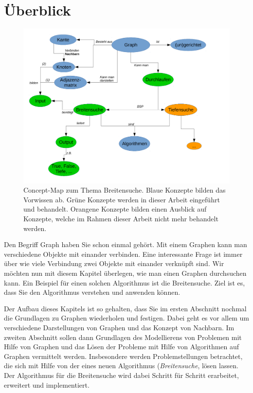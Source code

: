 \section*{Überblick}

\begin{figure}[htb]
\begin{center}
\includegraphics[width=.99\textwidth]{../cmap/bsuche_cmap.pdf}
\caption{Concept-Map zum Thema Breitensuche.
Blaue Konzepte bilden das Vorwissen ab. 
Grüne Konzepte werden in dieser Arbeit eingeführt und behandelt. 
Orangene Konzepte bilden einen Ausblick auf Konzepte, welche im Rahmen dieser Arbeit nicht mehr behandelt werden. 
}
\label{fig:cmap2}
\end{center}
\end{figure}


Den Begriff Graph haben Sie schon einmal gehört. Mit einem Graphen kann man verschiedene Objekte mit einander verbinden. 
Eine interessante Frage ist immer über wie viele Verbindung zwei Objekte mit einander verknüpft sind. 
Wir möchten nun mit diesem Kapitel überlegen, wie man einen Graphen durchsuchen kann.
Ein Beispiel für einen solchen Algorithmus ist die Breitensuche. 
Ziel ist es, dass Sie den Algorithmus verstehen und anwenden können. 

Der Aufbau dieses Kapitels ist so gehalten, dass Sie im ersten Abschnitt nochmal die Grundlagen zu Graphen wiederholen und festigen. 
Dabei geht es vor allem um verschiedene Darstellungen von Graphen und das Konzept von Nachbarn.
Im zweiten Abschnitt sollen dann Grundlagen des Modellierens von Problemen mit Hilfe von Graphen und das L\"osen der Probleme mit Hilfe von Algorithmen auf Graphen vermittelt werden.
Insbesondere werden Problemstellungen betrachtet, die sich mit Hilfe von der eines neuen Algorithmus (\emph{Breitensuche}, lösen lassen. 
Der Algorithmus für die Breitensuche wird dabei Schritt f\"ur Schritt erarbeitet, erweitert und implementiert.

